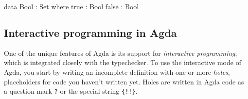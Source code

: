 \documentclass[a4paper,UKenglish]{tufte-handout}
\theoremstyle{definition}
\begin{document}
\begin{code}[hide]
data Bool : Set where
  true   : Bool
  false  : Bool
\end{code}


\subsection{Interactive programming in Agda}

One of the unique features of Agda is its support for
\emph{interactive programming}, which is integrated closely with the
typechecker. To use the interactive mode of Agda, you start by writing
an incomplete definition with one or more \emph{holes}, placeholders
for code you haven't written yet. Holes are written in Agda code as a
question mark \texttt{?} or the special string \texttt{\{!!\}}.
\end{document}
